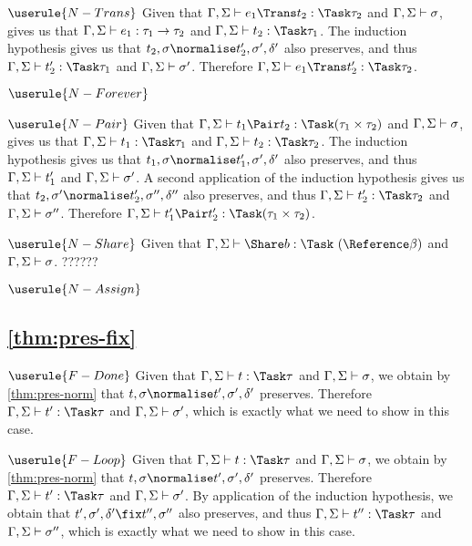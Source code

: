\case
  {$\userule{N-Trans}$}
  {Given that $\Gamma,\Sigma\infers e_1\Trans t_2:\Task\tau_2$ and $\Gamma,\Sigma\vdash\sigma$,  gives us that $\Gamma,\Sigma\vdash e_1:\tau_1\rightarrow \tau_2$ and $\Gamma,\Sigma\infers t_2:\Task\tau_1$.
  The induction hypothesis gives us that $t_2,\sigma\normalise t_2',\sigma',\delta'$ also preserves, and thus $\Gamma,\Sigma\infers t_2':\Task\tau_1$ and $\Gamma,\Sigma\vdash\sigma'$.
  Therefore $\Gamma,\Sigma\infers e_1\Trans t_2':\Task\tau_2$.}

\case
  {$\userule{N-Forever}$}
  {}

\case
  {$\userule{N-Pair}$}
  {Given that $\Gamma,\Sigma\infers t_1\Pair t_2:\Task (\tau_1\times\tau_2)$ and $\Gamma,\Sigma\vdash\sigma$,  gives us that $\Gamma,\Sigma\infers t_1:\Task \tau_1$ and $\Gamma,\Sigma\infers t_2:\Task \tau_2$.
  The induction hypothesis gives us that $t_1,\sigma\normalise t_1',\sigma',\delta'$ also preserves,
  and thus $\Gamma,\Sigma\vdash t_1'$ and $\Gamma,\Sigma\vdash \sigma'$.
  A second application of the induction hypothesis gives us that $t_2,\sigma'\normalise t_2',\sigma'',\delta''$ also preserves, and thus $\Gamma,\Sigma\infers t_2':\Task\tau_2$ and $\Gamma,\Sigma\vdash \sigma''$.
  Therefore $\Gamma,\Sigma\infers t_1'\Pair t_2':\Task (\tau_1\times\tau_2)$.}

\case
  {$\userule{N-Share}$}
  {Given that $\Gamma,\Sigma\infers \Share b:\Task\ (\Reference \beta)$ and $\Gamma,\Sigma\vdash\sigma$.
  ?????? 
  }

\case
  {$\userule{N-Assign}$}
  {}


\subsection{\cref{thm:pres-fix}}

\case
  {$\userule{F-Done}$}
  {Given that $\Gamma,\Sigma\infers t :\Task\tau$ and $\Gamma,\Sigma\vdash \sigma$, we obtain by \cref{thm:pres-norm} that $t,\sigma\normalise t',\sigma',\delta'$ preserves. Therefore $\Gamma,\Sigma\infers t':\Task\tau$ and $\Gamma,\Sigma\vdash\sigma'$, which is exactly what we need to show in this case.}

\case
  {$\userule{F-Loop}$}
  {Given that $\Gamma,\Sigma\infers t :\Task\tau$ and $\Gamma,\Sigma\vdash \sigma$, we obtain by \cref{thm:pres-norm} that $t,\sigma\normalise t',\sigma',\delta'$ preserves. Therefore $\Gamma,\Sigma\infers t':\Task\tau$ and $\Gamma,\Sigma\vdash\sigma'$.
  By application of the induction hypothesis, we obtain that $t',\sigma',\delta'\fix t'',\sigma''$ also preserves, and thus $\Gamma,\Sigma\infers t'':\Task\tau$ and $\Gamma,\Sigma\vdash\sigma''$, which is exactly what we need to show in this case.}
